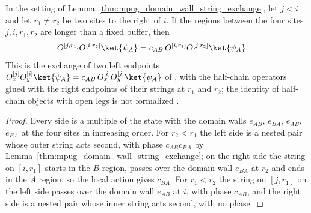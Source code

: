 \begin{lemma}
    \label{thm:mpug_domain_wall_endpoint_exchange}
    \leanok
    In the setting of Lemma~\ref{thm:mpug_domain_wall_string_exchange},
    let $j<i$ and let $r_1\neq r_2$ be two sites to the right of $i$. If the
    regions between the four sites $j,i,r_1,r_2$ are longer than a fixed
    buffer, then
    \begin{align}
        O^{[j,r_1]}O^{[i,r_2]}\ket{\psi_A}
         & =c_{AB}\,O^{[i,r_1]}O^{[j,r_2]}\ket{\psi_A}.
        \notag
    \end{align}
    This is the exchange of two left endpoints
    $O^{[j]}_xO^{[i]}_y\ket{\psi_A}=c_{AB}\,O^{[i]}_xO^{[j]}_y\ket{\psi_A}$
    of \cite[Section~III.F]{GarreRubioSchuch2024DomainWall}, with the
    half-chain operators glued with the right endpoints of their strings at
    $r_1$ and $r_2$; the identity of half-chain objects with open legs is not
    formalized \cite{gap:gs24_domain_wall_half_string_gluing}.
\end{lemma}

\begin{proof}\leanok
    Every side is a multiple of the state with the domain walls $e_{AB}$,
    $e_{BA}$, $e_{AB}$, $e_{BA}$ at the four sites in increasing order. For
    $r_2<r_1$ the left side is a nested pair whose outer string acts second,
    with phase $c_{AB}c_{BA}$ by
    Lemma~\ref{thm:mpug_domain_wall_string_exchange}; on the right side the
    string on $[i,r_1]$ starts in the $B$ region, passes over the domain wall
    $e_{BA}$ at $r_2$ and ends in the $A$ region, so the local action gives
    $c_{BA}$. For $r_1<r_2$ the string on $[j,r_1]$ on the left side passes
    over the domain wall $e_{AB}$ at $i$, with phase $c_{AB}$, and the right
    side is a nested pair whose inner string acts second, with no phase.
\end{proof}

